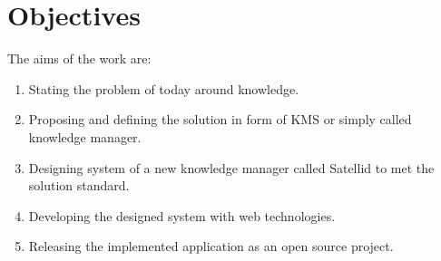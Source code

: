 \section{Objectives}
\label{sec:objectives}

The aims of the work are:

\begin{enumerate}
\item Stating the problem of today around knowledge.
\item Proposing and defining the solution in form of \ac{KMS} or simply called knowledge manager.
\item Designing system of a new knowledge manager called Satellid to met the solution standard.
\item Developing the designed system with web technologies.
\item Releasing the implemented application as an open source project.
\end{enumerate}
